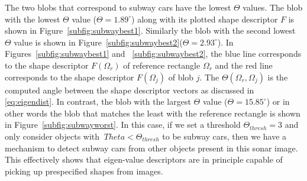 \documentclass {udthesis}
\begin{document}
The two blobs that correspond to subway cars have the lowest $\Theta$ values. The blob with the lowest $\Theta$ value ($\Theta=1.89^{\circ}$) along with its plotted shape descriptor $F$ is shown in Figure~\ref{subfig:subwaybest1}. Similarly the blob with the second lowest $\Theta$ value is shown in Figure~\ref{subfig:subwaybest2}($\Theta=2.93^{\circ}$). In Figures~\ref{subfig:subwaybest1} and ~\ref{subfig:subwaybest2}, the blue line corresponds to the shape descriptor $F(\Omega_r)$ of reference rectangle $\Omega_r$ and the red line corresponds to the shape descriptor $F(\Omega_j)$ of blob $j$. The $\Theta(\Omega_r,\Omega_j)$ is the computed angle between the shape descriptor vectors as discussed in \eqref{eq:eigendist}. In contrast, the blob with the largest $\Theta$ value ($\Theta=15.85^{\circ}$) or in other words the blob that matches the least with the reference rectangle is shown in Figure~\ref{subfig:subwayworst}. In this case, if we set a threshold $\Theta_{thresh}=3$ and only consider objects with $\
Theta<\Theta_{
thresh}$ to 
be subway cars, then we have a mechanism to detect subway cars from other objects present in this sonar image. This effectively shows that eigen-value descriptors are in principle capable of picking up prespecified shapes from images.
\end{document}
